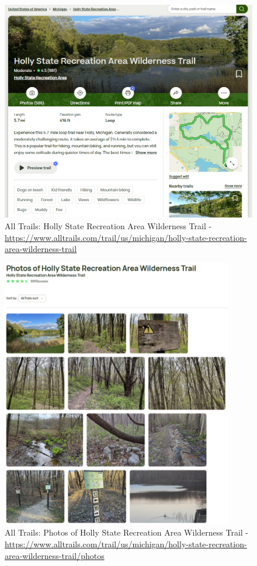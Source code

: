 \documentclass[12pt]{article}
\begin{document}
\begin{figure}[ht!]
    \centering
    \includegraphics[width=\textwidth]{./AT_HSRAWT1.PNG}
    \caption{All Trails: Holly State Recreation Area Wilderness Trail - \url{https://www.alltrails.com/trail/us/michigan/holly-state-recreation-area-wilderness-trail}}
    \label{fig:AT_HSRAWT1}
\end{figure}

\begin{figure}[ht!]
    \centering
    \includegraphics[width=0.9\textwidth]{./AT_HSRAWT_Photos.PNG}
    \caption{All Trails: Photos of Holly State Recreation Area Wilderness Trail - \url{https://www.alltrails.com/trail/us/michigan/holly-state-recreation-area-wilderness-trail/photos}}
    \label{fig:AT_HSRAWT_Photos}
\end{figure}
\end{document}
